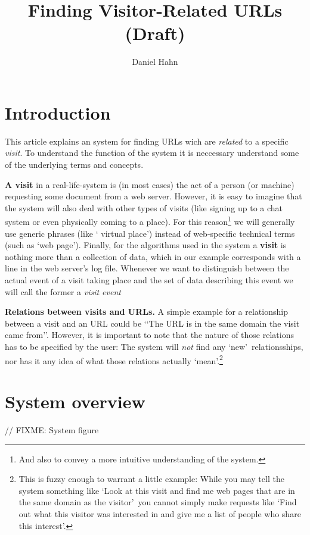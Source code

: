 \documentclass[a4paper]{danarticle}
\begin{document}
  \author{Daniel Hahn}
  \title{Finding Visitor-Related URLs (Draft)}
  \maketitle
  
  \section*{Introduction}
    This article explains an system for finding URLs wich are
    \textit{related} to a specific \textit{visit}. To understand the
    function of the system it is neccessary understand
    some of the underlying terms and concepts.
    
    \textbf{A visit} in a real-life-system is (in most cases) the
    act of a person (or machine) requesting some document from a
    web server. However, it is easy to imagine that the system will
    also deal with other types of visits (like signing up to a
    chat system or even physically coming to a place). For this
    reason\footnote{And also to convey a more intuitive understanding
    of the system.} we will generally use generic phrases (like \lq 
    virtual place\rq ) instead of web-specific technical terms (such
    as \lq web page\rq ). Finally, for the algorithms used in the
    system a \textbf{visit} is nothing more than a collection of
    data, which in our example corresponds with a line in the web
    server's log file. Whenever we want to distinguish between the
    actual event of a visit taking place and the set of data
    describing this event we will call the former a \textit{visit event}
    
    \textbf{Relations between visits and URLs.} A simple example
    for a relationship between a visit and an URL could be
    \lq\lq The URL is in the same domain the visit came from\rq\rq .
    However, it is important to note that the nature of those 
    relations has to be specified by the user: The system will 
    \textit{not} find any \lq new\rq\ relationsships, nor has it 
    any idea of what those relations actually \lq mean\rq .\footnote{This
    is fuzzy enough to warrant a little example: While you may tell the
    system something like \lq Look at this visit and find me web 
    pages that are in the same domain as the visitor\rq\ you cannot
    simply make requests like \lq Find out what this visitor was 
    interested in and give me a list of people who share this
    interest\rq .} 
    
  \section*{System overview}
    // FIXME: System figure
\end{document}
